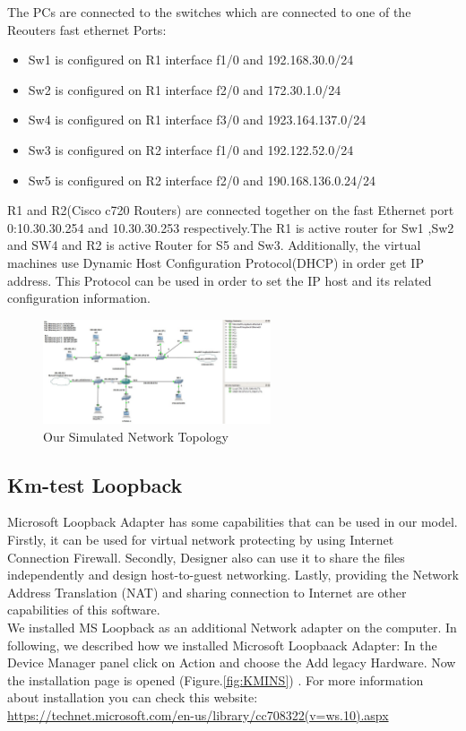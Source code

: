 \documentclass{article}
\begin{document}
The PCs are connected to the switches which are connected to one of the Reouters fast ethernet Ports:


\begin{itemize}
	
	\item Sw1 is configured on R1 interface f1/0 and 192.168.30.0/24
	\item Sw2 is configured on R1 interface f2/0 and 172.30.1.0/24
	\item Sw4 is configured on R1 interface f3/0 and 1923.164.137.0/24
	\item Sw3 is configured on R2 interface f1/0 and 192.122.52.0/24
	\item Sw5 is configured on R2 interface f2/0 and 190.168.136.0.24/24
\end{itemize}

R1 and R2(Cisco c720 Routers) are connected together on the fast Ethernet port 0:10.30.30.254 and 10.30.30.253 respectively.The R1 is active router for Sw1 ,Sw2 and SW4 and R2 is active Router for S5 and Sw3. Additionally, the virtual machines use Dynamic Host Configuration Protocol(DHCP) in order get IP address. This Protocol can be used in order to set the IP host and its related configuration information.


\begin{figure}[H]
	\begin{center}
		\includegraphics[width=0.6\textwidth]{Topology.jpg}
	\end{center}
	\caption{\small  Our Simulated Network Topology\newline}
	\label{fig:TPLGY}
\end{figure}
\subsection{Km-test Loopback}

Microsoft Loopback Adapter has some capabilities that can be used in our model. Firstly, it can be used for virtual network protecting by using Internet Connection Firewall. Secondly, Designer also can use it to share the files independently and design host-to-guest networking. Lastly, providing the Network Address Translation (NAT) and sharing connection to Internet are other capabilities of this software.\\
We installed MS Loopback as an additional Network adapter on the computer. In following, we described how we installed Microsoft Loopbaack Adapter:
In the Device Manager panel click on Action and choose the Add legacy Hardware. Now the installation page is opened (Figure.\ref{fig:KMINS}) . For more information about installation you can check this website:\\
	\url{https://technet.microsoft.com/en-us/library/cc708322(v=ws.10).aspx}
\end{document}
